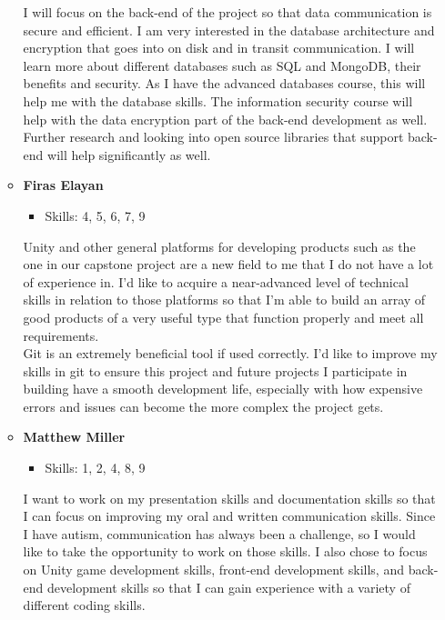 \documentclass[12pt]{article}
\begin{document}
\begin{enumerate}
\begin{itemize}
        I will focus on the back-end of the project so that data communication is secure and efficient. I am very interested in the database architecture and encryption that goes into on disk and in transit communication. I will learn more about different databases such as SQL and MongoDB, their benefits and security. As I have the advanced databases course, this will help me with the database skills. The information security course will help with the data encryption part of the back-end development as well. Further research and looking into open source libraries that support back-end will help significantly as well.
      \item \textbf{Firas Elayan}
        \begin{itemize}
        \item Skills: 4, 5, 6, 7, 9
        \end{itemize}
        Unity and other general platforms for developing products such as the one in our capstone project are a new field to me that I do not have a lot of experience in. I'd like to acquire a near-advanced level of technical skills in relation to those platforms so that I'm able to build an array of good products of a very useful type that function properly and meet all requirements.\\
        Git is an extremely beneficial tool if used correctly. I'd like to improve my skills in git to ensure this project and future projects I participate in building have a smooth development life, especially with how expensive errors and issues can become the more complex the project gets.
      \item \textbf{Matthew Miller}
        \begin{itemize}
            \item Skills: 1, 2, 4, 8, 9
        \end{itemize}
        I want to work on my presentation skills and documentation skills so that I can focus on improving my oral and written communication skills. Since I have autism, communication has always been a challenge, so I would like to take the opportunity to work on those skills.
        I also chose to focus on Unity game development skills, front-end development skills, and back-end development skills so that I can gain experience with a variety of different coding skills.


\end{itemize}
\end{enumerate}
\end{document}

